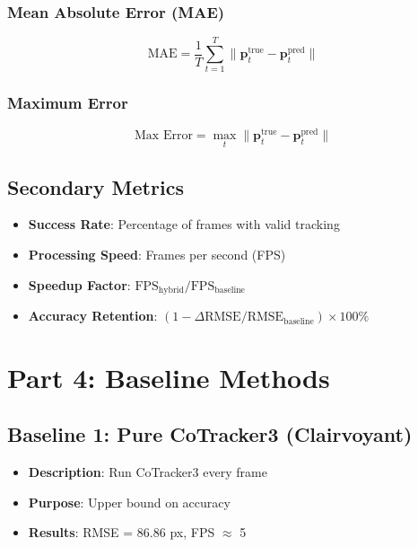 \documentclass[11pt]{article}
\begin{document}
\subsubsection{Mean Absolute Error (MAE)}
\begin{equation}
\text{MAE} = \frac{1}{T} \sum_{t=1}^{T} \|\mathbf{p}_t^{\text{true}} - \mathbf{p}_t^{\text{pred}}\|
\end{equation}

\subsubsection{Maximum Error}
\begin{equation}
\text{Max Error} = \max_{t} \|\mathbf{p}_t^{\text{true}} - \mathbf{p}_t^{\text{pred}}\|
\end{equation}

\subsection{Secondary Metrics}

\begin{itemize}
    \item \textbf{Success Rate}: Percentage of frames with valid tracking
    \item \textbf{Processing Speed}: Frames per second (FPS)
    \item \textbf{Speedup Factor}: $\text{FPS}_{\text{hybrid}} / \text{FPS}_{\text{baseline}}$
    \item \textbf{Accuracy Retention}: $(1 - \Delta\text{RMSE}/\text{RMSE}_{\text{baseline}}) \times 100\%$
\end{itemize}

\section{Part 4: Baseline Methods}

\subsection{Baseline 1: Pure CoTracker3 (Clairvoyant)}
\begin{itemize}
    \item \textbf{Description}: Run CoTracker3 every frame
    \item \textbf{Purpose}: Upper bound on accuracy
    \item \textbf{Results}: RMSE = 86.86 px, FPS $\approx$ 5
\end{itemize}
\end{document}
